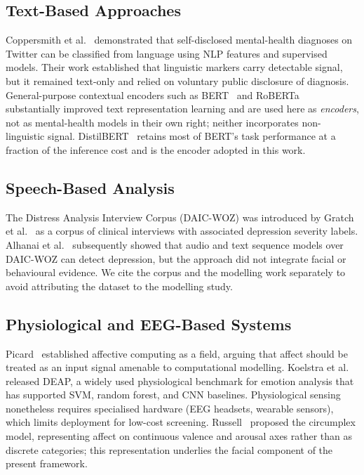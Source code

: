 \documentclass[12pt]{article}
\begin{document}
\subsection{Text-Based Approaches}

Coppersmith et al.~\cite{coppersmith2015mental} demonstrated that
self-disclosed mental-health diagnoses on Twitter can be classified from
language using NLP features and supervised models. Their work established
that linguistic markers carry detectable signal, but it remained
text-only and relied on voluntary public disclosure of diagnosis.
General-purpose contextual encoders such as BERT~\cite{devlin2019bert}
and RoBERTa~\cite{liu2019roberta} substantially improved text
representation learning and are used here as \emph{encoders}, not as
mental-health models in their own right; neither incorporates
non-linguistic signal. DistilBERT~\cite{sanh2019distilbert} retains most
of BERT's task performance at a fraction of the inference cost and is
the encoder adopted in this work.

\subsection{Speech-Based Analysis}

The Distress Analysis Interview Corpus (DAIC-WOZ) was introduced by
Gratch et al.~\cite{gratch2014daic} as a corpus of clinical interviews
with associated depression severity labels. Alhanai et
al.~\cite{alhanai2018daic} subsequently showed that audio and text
sequence models over DAIC-WOZ can detect depression, but the approach
did not integrate facial or behavioural evidence. We cite the corpus and
the modelling work separately to avoid attributing the dataset to the
modelling study.

\subsection{Physiological and EEG-Based Systems}

Picard~\cite{picard1997affective} established affective computing as a
field, arguing that affect should be treated as an input signal amenable
to computational modelling. Koelstra et al.~\cite{koelstra2012deap}
released DEAP, a widely used physiological benchmark for emotion
analysis that has supported SVM, random forest, and CNN baselines.
Physiological sensing nonetheless requires specialised hardware (EEG
headsets, wearable sensors), which limits deployment for low-cost
screening. Russell~\cite{russell1980circumplex} proposed the
circumplex model, representing affect on continuous valence and arousal
axes rather than as discrete categories; this representation underlies
the facial component of the present framework.
\end{document}
